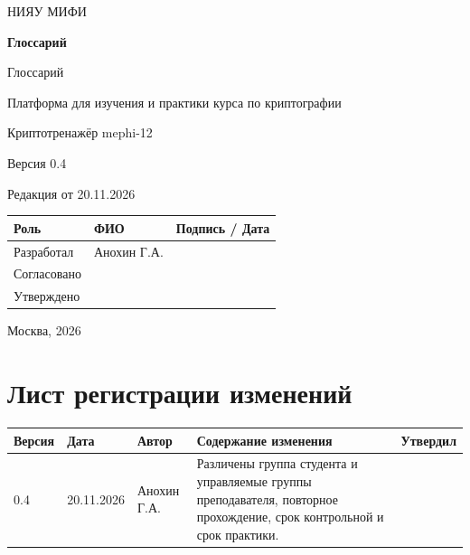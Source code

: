 \documentclass[12pt,a4paper]{article}
\begin{document}
\hypersetup{pageanchor=false}
\begin{titlepage}
  \thispagestyle{empty}
  \centering
  {\large НИЯУ МИФИ\par}
  \vspace*{3.5cm}
  {\LARGE\bfseries Глоссарий\par}
  \vspace{0.5cm}
  {\large Глоссарий\par}
  \vspace{0.6cm}
  {\large Платформа для изучения и практики курса по криптографии\par}
  {\large Криптотренажёр mephi-12\par}
  \vspace{0.7cm}
  {\large Версия 0.4\par}
  {\large Редакция от 20.11.2026\par}
  \vspace{1cm}
  \begin{tabularx}{\textwidth}{@{}p{3.4cm}Xp{4cm}@{}}
    \toprule
    Роль & ФИО & Подпись / Дата \\
    \midrule
    Разработал & Анохин Г.А. & \\
    \addlinespace[6pt]
    Согласовано & & \\
    \addlinespace[6pt]
    Утверждено & & \\
    \bottomrule
  \end{tabularx}
  \vfill
  {\large Москва, 2026\par}
\end{titlepage}
\hypersetup{pageanchor=true}

\section*{Лист регистрации изменений}
\begingroup\small\singlespacing
\noindent
\begin{tabularx}{\textwidth}{@{}p{1.2cm}p{2cm}p{2.5cm}Xp{1.8cm}@{}}
\toprule
Версия & Дата & Автор & Содержание изменения & Утвердил \\
\midrule
0.4 & 20.11.2026 & Анохин Г.А. & Различены группа студента и управляемые группы преподавателя, повторное прохождение, срок контрольной и срок практики. & \\
\bottomrule
\end{tabularx}
\endgroup
\clearpage
\begingroup\small\singlespacing
\tableofcontents
\endgroup
\clearpage

\hypertarget{глоссарий}{}
\end{document}
